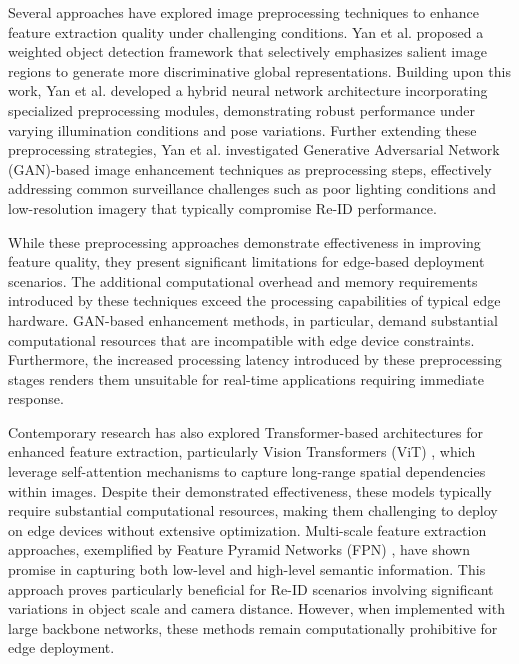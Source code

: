 \documentclass[../main.tex]{subfiles}
\begin{document}
Several approaches have explored image preprocessing techniques to enhance feature extraction quality under challenging conditions. Yan et al. \cite{app12157825} proposed a weighted object detection framework that selectively emphasizes salient image regions to generate more discriminative global representations. Building upon this work, Yan et al. \cite{yan2021hybrid} developed a hybrid neural network architecture incorporating specialized preprocessing modules, demonstrating robust performance under varying illumination conditions and pose variations. Further extending these preprocessing strategies, Yan et al. \cite{yan2022gan} investigated Generative Adversarial Network (GAN)-based image enhancement techniques as preprocessing steps, effectively addressing common surveillance challenges such as poor lighting conditions and low-resolution imagery that typically compromise Re-ID performance.

While these preprocessing approaches demonstrate effectiveness in improving feature quality, they present significant limitations for edge-based deployment scenarios. The additional computational overhead and memory requirements introduced by these techniques exceed the processing capabilities of typical edge hardware. GAN-based enhancement methods, in particular, demand substantial computational resources that are incompatible with edge device constraints. Furthermore, the increased processing latency introduced by these preprocessing stages renders them unsuitable for real-time applications requiring immediate response.

Contemporary research has also explored Transformer-based architectures for enhanced feature extraction, particularly Vision Transformers (ViT) \cite{dosovitskiy2021imageworth16x16words}, which leverage self-attention mechanisms to capture long-range spatial dependencies within images. Despite their demonstrated effectiveness, these models typically require substantial computational resources, making them challenging to deploy on edge devices without extensive optimization. Multi-scale feature extraction approaches, exemplified by Feature Pyramid Networks (FPN) \cite{lin2017featurepyramidnetworksobject}, have shown promise in capturing both low-level and high-level semantic information. This approach proves particularly beneficial for Re-ID scenarios involving significant variations in object scale and camera distance. However, when implemented with large backbone networks, these methods remain computationally prohibitive for edge deployment.
\end{document}
